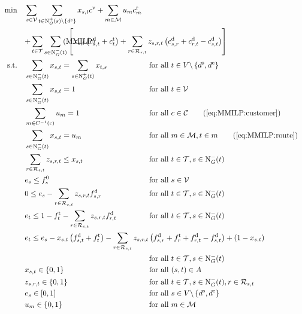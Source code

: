 \begin{align}
	\min \quad & \sum_{s\in\mathcal{V}} \sum_{t\in\Nout(s)\backslash\{d^{\operatorname{e}}\}} x_{s,t}\cv + \sum_{m\in\mathcal{M}} u_m \croute_m \nonumber \\
	& \omit\rlap{$\displaystyle{ + \sum_{t\in\mathcal{T}} \sum_{s\in\Nin(t)} \left[x_{s,t}\left(\cd_{s,t}+\ct_{t}\right) + \sum_{r\in\Rst} z_{s,r,t}\left(\cd_{s,r}+\cd_{r,t}-\cd_{s,t}\right)\right]}$} \tag{MMILP} \label{eq:MMILP} \\
	\text{s.t.} \quad & \sum_{s\in\Nin(t)} x_{s,t} = \sum_{s\in\Nout(t)} x_{t,s} & & \text{for all } t\in V\backslash\left\{d^{\operatorname{s}},d^{\operatorname{e}}\right\} \label{eq:MMILP:flow} \\
	& \sum_{s\in\Nin(t)} x_{s,t} = 1 & & \text{for all } t\in\mathcal{V} \label{eq:MMILP:vehicles} \\
	& \sum_{m\in C^{-1}(c)} u_m = 1 && \text{for all } c\in\mathcal{C} \tag{\ref{eq:MMILP:customer}} \\
	& \sum_{s\in\Nin(t)} x_{s,t} = u_m && \text{for all } m\in\mathcal{M}, t\in m \tag{\ref{eq:MMILP:route}} \\
	& \sum_{r\in\Rst} z_{s,r,t} \leq x_{s,t} & & \text{for all } t\in\mathcal{T}, s\in\Nin(t) \label{eq:MMILP:refuel} \\
	& e_s \leq f_s^0 & & \text{for all } s\in\mathcal{V} \label{eq:MMILP:initial_fuel} \\
	& 0 \leq e_s - \sum_{r\in\Rst} z_{s,r,t}\fd_{s,r} & & \text{for all } t\in\mathcal{T}, s\in\Nin(t) \label{eq:MMILP:min_fuel} \\
	& e_t \leq 1 - \ft_t - \sum_{r\in\Rst} z_{s,r,t}\fd_{r,t} & & \text{for all } t\in\mathcal{T}, s\in\Nin(t) \label{eq:MMILP:max_fuel} \\
	& \omit\rlap{$\displaystyle{e_t \leq e_s - x_{s,t}\left(f_{s,t}^{\operatorname{d}}+f_t^{\operatorname{t}}\right) - \sum_{r\in\Rst} z_{s,r,t}\left(\fd_{s,r}+\ft_r+\fd_{r,t}-\fd_{s,t}\right) + \left(1-x_{s,t}\right)}$} \nonumber \\
	& & & \text{for all } t\in\mathcal{T}, s\in\Nin(t) \label{eq:MMILP:fuel_consumption} \\
	& x_{s,t}\in\{0,1\} & & \text{for all } (s,t)\in A \label{eq:MMILP:xst} \\
	& z_{s,r,t}\in\{0,1\} & & \text{for all } t\in\mathcal{T},s\in\Nin(t),r\in\Rst \label{eq:MMILP:zsrt} \\
	& e_s\in[0,1] & & \text{for all } s\in V\backslash\left\{d^{\operatorname{s}},d^{\operatorname{e}}\right\} \label{eq:MMILP:es} \\
	& u_m\in\{0,1\} && \text{for all } m\in\mathcal{M} \label{eq:MMILP:um}
\end{align}

